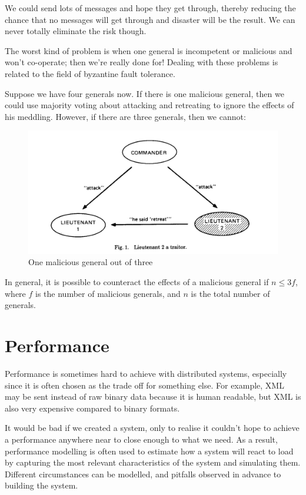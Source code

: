 We could send lots of messages and hope they get through, thereby reducing the
chance that no messages will get through and disaster will be the result. We can
never totally eliminate the risk though.

The worst kind of problem is when one general is incompetent or malicious and
won't co-operate; then we're really done for! Dealing with these problems is
related to the field of byzantine fault tolerance.

Suppose we have four generals now. If there is one malicious general, then we
could use majority voting about attacking and retreating to ignore the effects
of his meddling. However, if there are three generals, then we cannot:

\begin{figure}[H]
  \centering
  \includegraphics[width=\textwidth]{images/malicious-general}
  \caption{One malicious general out of three}
  \label{mal-general}
\end{figure}

In general, it is possible to counteract the effects of a malicious general if
$n\leq3f$, where $f$ is the number of malicious generals, and $n$ is the total
number of generals.

\section{Performance}

Performance is sometimes hard to achieve with distributed systems, especially
since it is often chosen as the trade off for something else. For example, XML
may be sent instead of raw binary data because it is human readable, but XML is
also very expensive compared to binary formats.

It would be bad if we created a system, only to realise it couldn't hope to
achieve a performance anywhere near to close enough to what we need. As a
result, performance modelling is often used to estimate how a system will react
to load by capturing the most relevant characteristics of the system and
simulating them. Different circumstances can be modelled, and pitfalls observed
in advance to building the system.

